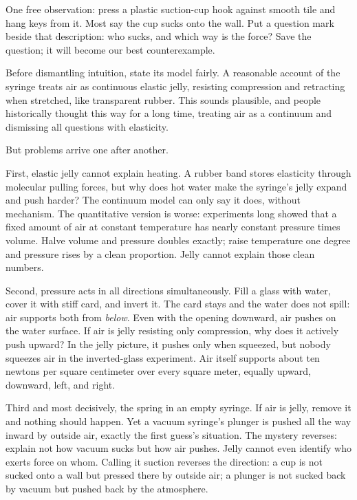 One free observation: press a plastic suction-cup hook against smooth tile and hang keys from it. Most say the cup sucks onto the wall. Put a question mark beside that description: who sucks, and which way is the force? Save the question; it will become our best counterexample.


Before dismantling intuition, state its model fairly. A reasonable account of the syringe treats air as continuous elastic jelly, resisting compression and retracting when stretched, like transparent rubber. This sounds plausible, and people historically thought this way for a long time, treating air as a continuum and dismissing all questions with elasticity.

But problems arrive one after another.

First, elastic jelly cannot explain heating. A rubber band stores elasticity through molecular pulling forces, but why does hot water make the syringe's jelly expand and push harder? The continuum model can only say it does, without mechanism. The quantitative version is worse: experiments long showed that a fixed amount of air at constant temperature has nearly constant pressure times volume. Halve volume and pressure doubles exactly; raise temperature one degree and pressure rises by a clean proportion. Jelly cannot explain those clean numbers.

Second, pressure acts in all directions simultaneously. Fill a glass with water, cover it with stiff card, and invert it. The card stays and the water does not spill: air supports both from \emph{below}. Even with the opening downward, air pushes on the water surface. If air is jelly resisting only compression, why does it actively push upward? In the jelly picture, it pushes only when squeezed, but nobody squeezes air in the inverted-glass experiment. Air itself supports about ten newtons per square centimeter over every square meter, equally upward, downward, left, and right.

Third and most decisively, the spring in an empty syringe. If air is jelly, remove it and nothing should happen. Yet a vacuum syringe's plunger is pushed all the way inward by outside air, exactly the first guess's situation. The mystery reverses: explain not how vacuum sucks but how air pushes. Jelly cannot even identify who exerts force on whom. Calling it suction reverses the direction: a cup is not sucked onto a wall but pressed there by outside air; a plunger is not sucked back by vacuum but pushed back by the atmosphere.

